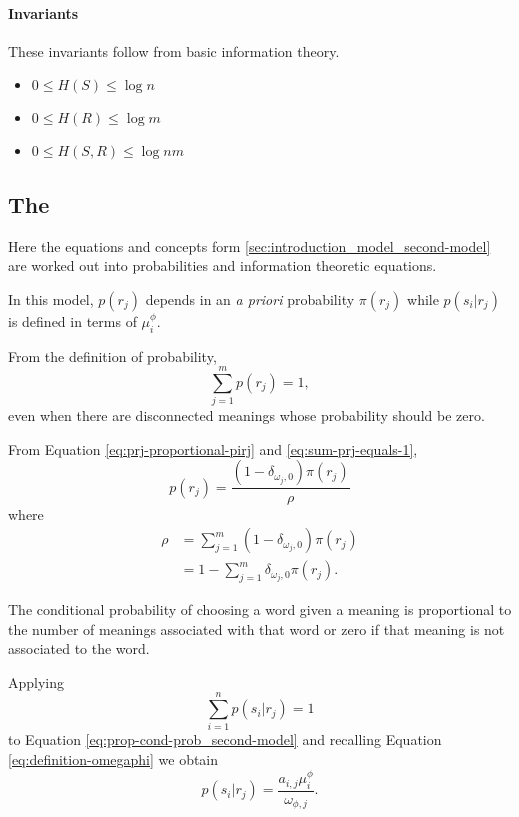 \paragraph{Invariants} These invariants follow from basic information theory.
\cite{Cover1999}

\begin{itemize}
\item $0 \leq H(S) \leq \log n$
\item $0 \leq H(R) \leq \log m$
\item $0 \leq H(S,R) \leq \log nm$
\end{itemize}

\subsection{The \secondmodel{}}
\label{sec:model_math_second-model}

Here the equations and concepts form \ref{sec:introduction_model_second-model} are worked out into probabilities and information theoretic equations.

In this model, $p(r_j)$ depends in an \emph{a priori} probability $\pi(r_j)$ while $p(s_i | r_j)$ is defined in terms of $\mu_i^\phi.$

From the definition of probability,
\begin{equation}
  \label{eq:sum-prj-equals-1}
  \sum_{j=1}^m p(r_j) = 1,
\end{equation}
even when there are disconnected meanings whose probability should be zero.

From Equation \eqref{eq:prj-proportional-pirj} and \ref{eq:sum-prj-equals-1},
\begin{equation}
  \label{eq:definition-prj_second-model}
  p(r_j) = \frac{(1 - \delta_{\omega_j,0}) \pi(r_j)}{\rho}
\end{equation}
where
\begin{align}
  \label{eq:definition-rho}
  \rho &= \sum_{j=1}^m (1 - \delta_{\omega_j,0}) \pi(r_j) \\
       &= 1 - \sum_{j=1}^m \delta_{\omega_j,0} \pi(r_j). \nonumber
\end{align}

The conditional probability of choosing a word given a meaning is proportional to the number of meanings associated with that word or zero if that meaning is not associated to the word.

Applying
\begin{equation*}
  \sum_{i=1}^n p(s_i | r_j) = 1
\end{equation*}
to Equation \eqref{eq:prop-cond-prob_second-model} and recalling Equation \eqref{eq:definition-omegaphi} we obtain
\begin{equation}
  \label{eq:definition-cond-prob_second-model}
  p(s_i | r_j) = \frac{a_{i,j} \mu_i^\phi}{\omega_{\phi,j}}.
\end{equation}

